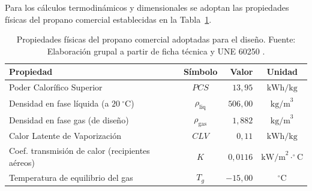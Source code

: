 \documentclass[12pt]{article}
\begin{document}
        \begin{table}[H]
            \centering
            \caption{Tabla maestra de consumidores industriales de la planta metalúrgica. Fuente: Elaboración grupal.}
            \label{tab:consumidores}
        \end{table}

        Para los cálculos termodinámicos y dimensionales se adoptan las propiedades físicas del propano comercial establecidas en la Tabla~\ref{tab:propiedades_gas}.

        \begin{table}[H]
            \centering
            \caption{Propiedades físicas del propano comercial adoptadas para el diseño. Fuente: Elaboración grupal a partir de ficha técnica y UNE 60250 \cite{une60250}.}
            \label{tab:propiedades_gas}
            \begin{tabular}{lcrc}
                \toprule
                \textbf{Propiedad} & \textbf{Símbolo} & \textbf{Valor} & \textbf{Unidad} \\
                \midrule
                Poder Calorífico Superior & $PCS$ & $13,95$ & $\text{kWh/kg}$ \\
                Densidad en fase líquida (a $20\ ^{\circ}\text{C}$) & $\rho_{\text{liq}}$ & $506,00$ & $\text{kg/m}^3$ \\
                Densidad en fase gas (de diseño) & $\rho_{\text{gas}}$ & $1,882$ & $\text{kg/m}^3$ \\
                Calor Latente de Vaporización & $CLV$ & $0,11$ & $\text{kWh/kg}$ \\
                Coef. transmisión de calor (recipientes aéreos) & $K$ & $0,0116$ & $\text{kW/m}^2\cdot^{\circ}\text{C}$ \\
                Temperatura de equilibrio del gas & $T_g$ & $-15,00$ & $^{\circ}\text{C}$ \\
                \bottomrule
            \end{tabular}
        \end{table}
\end{document}
